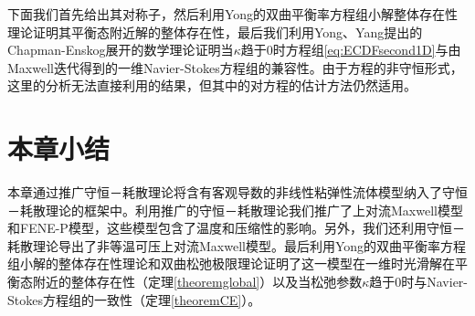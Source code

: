 下面我们首先给出其对称子，然后利用Yong的双曲平衡率方程组小解整体存在性理论\cite{yong2004entropy}证明其平衡态附近解的整体存在性，最后我们利用Yong、Yang提出的Chapman-Enskog展开的数学理论\cite{yang2015validity}证明当$\kappa$趋于$0$时方程组\eqref{eq:ECDFsecond1D}与由Maxwell迭代得到的一维Navier-Stokes方程组的兼容性。由于方程的非守恒形式，这里的分析无法直接利用\cite{yong2004entropy,yang2015validity}的结果，但其中的对方程的估计方法仍然适用。



\section{本章小结}
本章通过推广守恒－耗散理论将含有客观导数的非线性粘弹性流体模型纳入了守恒－耗散理论的框架中。利用推广的守恒－耗散理论我们推广了上对流Maxwell模型和FENE-P模型，这些模型包含了温度和压缩性的影响。另外，我们还利用守恒－耗散理论导出了非等温可压上对流Maxwell模型。最后利用Yong的双曲平衡率方程组小解的整体存在性理论和双曲松弛极限理论证明了这一模型在一维时光滑解在平衡态附近的整体存在性（定理\ref{theoremglobal}）以及当松弛参数$\kappa$趋于$0$时与Navier-Stokes方程组的一致性（定理\ref{theoremCE}）。



% 